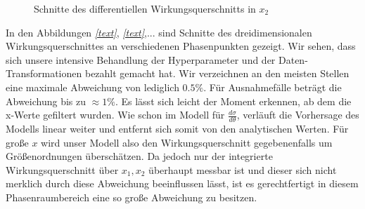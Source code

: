 \begin{figure}[tbp]
	\centering
	\caption{Schnitte des differentiellen Wirkungsquerschnitts in $x_2$}
	\label{7,10}
\end{figure}
In den Abbildungen \textit{\autoref{text}}, \textit{\autoref{text}},... sind Schnitte des dreidimensionalen Wirkungsquerschnittes an verschiedenen Phasenpunkten gezeigt. Wir sehen, dass sich unsere intensive Behandlung der Hyperparameter und der Daten-Transformationen bezahlt gemacht hat. Wir verzeichnen an den meisten Stellen eine maximale Abweichung von lediglich $0.5\%$. Für Ausnahmefälle beträgt die Abweichung bis zu $\approx 1\%$. Es lässt sich leicht der Moment erkennen, ab dem die x-Werte gefiltert wurden. Wie schon im Modell für $\frac{d\sigma}{d\theta}$, verläuft die Vorhersage des Modells linear weiter und entfernt sich somit von den analytischen Werten. Für große $x$ wird unser Modell also den Wirkungsquerschnitt gegebenenfalls um Größenordnungen überschätzen. Da jedoch nur der integrierte Wirkungsquerschnitt über $x_1, x_2$ überhaupt messbar ist und dieser sich nicht merklich durch diese Abweichung beeinflussen lässt, ist es gerechtfertigt in diesem Phasenraumbereich eine so große Abweichung zu besitzen. 
